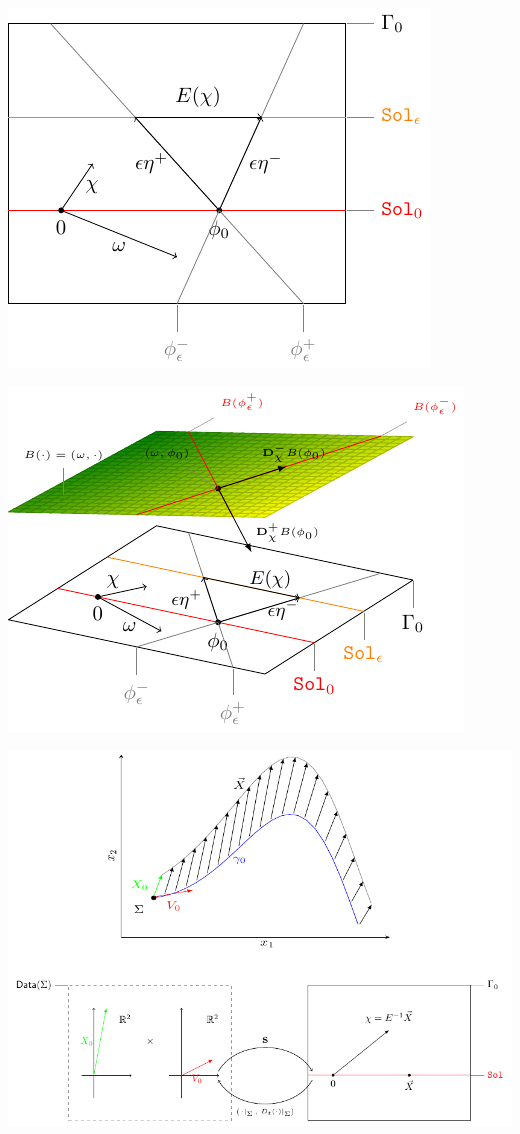 \documentclass[Main]{subfiles}
\begin{document}
	\includegraphics[width=\textwidth]{Pictures/compsupp_GeometricPicture2}
				
	\includegraphics[width=\textwidth]{Pictures/compsupp_GeometricPictureLinear}
				
	\includegraphics[width=\textwidth]{Pictures/Jacobi_GeometricPicturePanoramica}	
				
\end{document}
